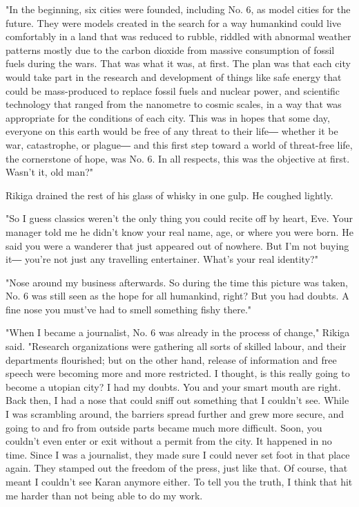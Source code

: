 "In the beginning, six cities were founded, including No. 6, as model
cities for the future. They were models created in the search for a way
humankind could live comfortably in a land that was reduced to rubble,
riddled with abnormal weather patterns mostly due to the carbon dioxide
from massive consumption of fossil fuels during the wars. That was what
it was, at first. The plan was that each city would take part in the
research and development of things like safe energy that could be
mass-produced to replace fossil fuels and nuclear power, and scientific
technology that ranged from the nanometre to cosmic scales, in a way
that was appropriate for the conditions of each city. This was in hopes
that some day, everyone on this earth would be free of any threat to
their life― whether it be war, catastrophe, or plague― and this first
step toward a world of threat-free life, the cornerstone of hope, was
No. 6. In all respects, this was the objective at first. Wasn't it, old
man?"

Rikiga drained the rest of his glass of whisky in one gulp. He coughed
lightly.

"So I guess classics weren't the only thing you could recite off by
heart, Eve. Your manager told me he didn't know your real name, age, or
where you were born. He said you were a wanderer that just appeared out
of nowhere. But I'm not buying it― you're not just any travelling
entertainer. What's your real identity?"

"Nose around my business afterwards. So during the time this picture was
taken, No. 6 was still seen as the hope for all humankind, right? But
you had doubts. A fine nose you must've had to smell something fishy
there."

"When I became a journalist, No. 6 was already in the process of
change," Rikiga said. "Research organizations were gathering all sorts
of skilled labour, and their departments flourished; but on the other
hand, release of information and free speech were becoming more and more
restricted. I thought, is this really going to become a utopian city? I
had my doubts. You and your smart mouth are right. Back then, I had a
nose that could sniff out something that I couldn't see. While I was
scrambling around, the barriers spread further and grew more secure, and
going to and fro from outside parts became much more difficult. Soon,
you couldn't even enter or exit without a permit from the city. It
happened in no time. Since I was a journalist, they made sure I could
never set foot in that place again. They stamped out the freedom of the
press, just like that. Of course, that meant I couldn't see Karan
anymore either. To tell you the truth, I think that hit me harder than
not being able to do my work.

